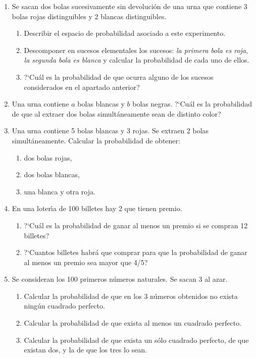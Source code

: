 \documentclass[11pt]{book}
\begin{document}
\begin{enumerate}
\item Se sacan dos  bolas  sucesivamente  sin  devoluci{\'o}n  de  una  urna  que
    contiene 3 bolas rojas distinguibles y 2 blancas distinguibles.
    \begin{enumerate}
      \item Describir el espacio de probabilidad asociado a este experimento.
      \item Descomponer en sucesos elementales los sucesos: {\em la primera bola  es
       roja}, {\em la segunda bola es blanca} y calcular la probabilidad de cada uno de ellos.
      \item
            ?`Cu{\'a}l es la probabilidad de que ocurra alguno de los sucesos considerados en el  apartado anterior?
    \end{enumerate}


\item  Una urna contiene $a$ bolas blancas y $b$ bolas  negras.  ?`Cu{\'a}l  es  la
    probabilidad de que  al  extraer  dos  bolas  simult{\'a}neamente  sean  de
    distinto color?

\item  Una urna contiene 5 bolas  blancas  y  3  rojas.  Se  extraen  2  bolas
    simult{\'a}neamente. Calcular la probabilidad de obtener:
    \begin{enumerate}
      \item dos bolas rojas,
      \item dos bolas blancas,
      \item una blanca y otra roja.
    \end{enumerate}

\item  En una loter{\'\i}a de 100 billetes hay 2 que tienen premio.
    \begin{enumerate}
      \item ?`Cu{\'a}l es la probabilidad de ganar al menos un premio si  se  compran
            12 billetes?
      \item ?`Cuantos billetes habr{\'a} que comprar  para  que  la  probabilidad  de
            ganar al menos un  premio sea mayor que 4/5?
    \end{enumerate}

\item  Se consideran los 100 primeros n{\'u}meros naturales. Se sacan 3 al azar.
    \begin{enumerate}
      \item Calcular la probabilidad de que en los 3 n{\'u}meros obtenidos no exista
            ning{\'u}n cuadrado perfecto.
      \item Calcular la probabilidad de que exista al menos un cuadrado perfecto.
      \item Calcular la probabilidad de que exista un  s{\'o}lo  cuadrado  perfecto,
            de que existan  dos, y la de que los tres lo sean.
    \end{enumerate}



\end{enumerate}
\end{document}
